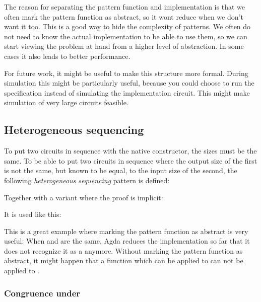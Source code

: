 The reason for separating the pattern function and implementation is
that we often mark the pattern function as abstract, so it wont reduce
when we don't want it too.
This is a good way to hide the complexity of patterns.
We often do not need to know the actual implementation to be able to
use them, so we can start viewing the problem at hand from a higher
level of abstraction.
In some cases it also leads to better performance.

For future work, it might be useful to make this structure more
formal.
During simulation this might be particularly useful, because you could
choose to run the specification instead of simulating the
implementation circuit.
This might make simulation of very large circuits feasible.

\subsection{Heterogeneous sequencing}\label{heterogeneous-sequencing}

To put two circuits in sequence with the native 
constructor, the sizes must be the same.
To be able to put two circuits in sequence where the output size of
the first is not the same, but known to be equal, to the input size of
the second, the following \emph{heterogeneous sequencing} pattern is
defined:


Together with a variant where the proof is implicit:


It is used like this:


This is a great example where marking the pattern function as abstract
is very useful:
When  and  are the same, Agda reduces the implementation
so far that it does not recognize it as a  anymore.
Without marking the pattern function as abstract, it might happen that
a function which can be applied to  \AP{⟫[}  \AP{]} 
can not be applied to  \AP{⟫[}  \AP{]} .


\subsubsection{\texorpdfstring{Congruence under
    }{Congruence under ⟫[]-cong}}\label{cong}

